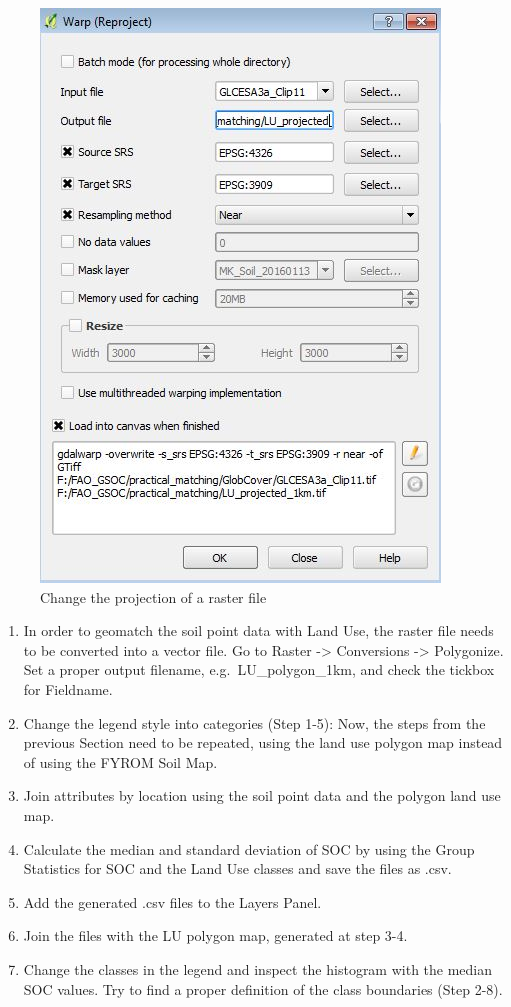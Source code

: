 \documentclass[10pt,b5paper,]{book}
\providecommand{\tightlist}{%
  \setlength{\itemsep}{0pt}\setlength{\parskip}{0pt}}
\theoremstyle{definition}
\theoremstyle{definition}
\theoremstyle{definition}
\theoremstyle{remark}
\begin{document}
\begin{figure}

{\centering \includegraphics[width=0.8\linewidth]{images/Conv_upscaling9} 

}

\caption{Change the projection of a raster file}\label{fig:unnamed-chunk-35}
\end{figure}

\begin{enumerate}
\def\labelenumi{\arabic{enumi}.}
\setcounter{enumi}{3}
\tightlist
\item
  In order to geomatch the soil point data with Land Use, the raster
  file needs to be converted into a vector file. Go to Raster
  -\textgreater{} Conversions -\textgreater{} Polygonize. Set a proper
  output filename, e.g.~LU\_polygon\_1km, and check the tickbox for
  Fieldname.
\item
  Change the legend style into categories (Step 1-5): Now, the steps
  from the previous Section need to be repeated, using the land use
  polygon map instead of using the FYROM Soil Map.
\item
  Join attributes by location using the soil point data and the polygon
  land use map.
\item
  Calculate the median and standard deviation of SOC by using the Group
  Statistics for SOC and the Land Use classes and save the files as
  .csv.
\item
  Add the generated .csv files to the Layers Panel.
\item
  Join the files with the LU polygon map, generated at step 3-4.
\item
  Change the classes in the legend and inspect the histogram with the
  median SOC values. Try to find a proper definition of the class
  boundaries (Step 2-8).
\end{enumerate}
\end{document}
